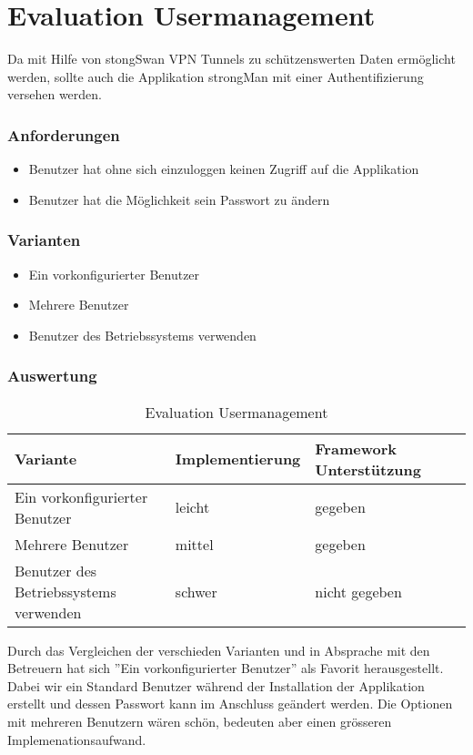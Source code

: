 \section{Evaluation Usermanagement}
Da mit Hilfe von stongSwan VPN Tunnels zu schützenswerten Daten ermöglicht werden, sollte auch die Applikation strongMan mit einer Authentifizierung versehen werden.
\subsubsection{Anforderungen}
\begin{itemize}
	\item Benutzer hat ohne sich einzuloggen keinen Zugriff auf die Applikation
	\item Benutzer hat die Möglichkeit sein Passwort zu ändern
\end{itemize}

\subsubsection{Varianten}
\begin{itemize}
	\item Ein vorkonfigurierter Benutzer
	\item Mehrere Benutzer
	\item Benutzer des Betriebssystems verwenden
\end{itemize}
\subsubsection{Auswertung}
\begin{table}[H]
\centering
    \begin{tabular}{|l|l|l|l|}
    \hline
    \rowcolor{lightblue}
    Variante & Implementierung & Framework Unterstützung   \\ \hline
	Ein vorkonfigurierter Benutzer	&	leicht	& gegeben		\\ \hline
		Mehrere Benutzer	&	mittel	& gegeben		\\ \hline
		Benutzer des Betriebssystems verwenden	&	schwer	& nicht gegeben	\\ 
		\hline	
	\end{tabular}
    \caption[Evaluation Usermanagement]{Evaluation Usermanagement}
\end{table}

Durch das Vergleichen der verschieden Varianten und in Absprache mit den Betreuern hat sich ''Ein vorkonfigurierter Benutzer'' als Favorit herausgestellt. Dabei wir ein Standard Benutzer während der Installation der Applikation erstellt und dessen Passwort kann im Anschluss geändert werden. Die Optionen mit mehreren Benutzern wären schön, bedeuten aber einen grösseren Implemenationsaufwand.

